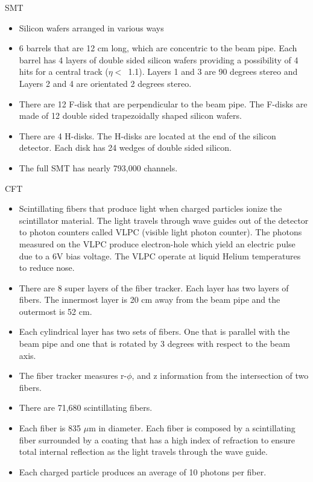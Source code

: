SMT
\begin{itemize}
\item Silicon wafers arranged in various ways
\item 6 barrels that are 12 cm long, which are concentric to the beam pipe. Each barrel has 4 layers of double sided silicon wafers providing a possibility of 4 hits for a central track ($\eta <$~1.1). Layers 1 and 3 are 90 degrees stereo and Layers 2 and 4 are orientated 2 degrees stereo.
\item There are 12 F-disk that are perpendicular to the beam pipe. The F-disks are made of 12 double sided trapezoidally shaped silicon wafers.
\item There are 4 H-disks. The H-disks are located at the end of the silicon detector. Each disk has 24 wedges of double sided silicon.
\item The full SMT has nearly 793,000 channels.
\end{itemize}

CFT
\begin{itemize}
\item Scintillating fibers that produce light when charged particles ionize the scintillator material. The light travels through wave guides out of the detector to photon counters called VLPC (visible light photon counter). The photons measured on the VLPC produce electron-hole which yield an electric pulse due to a 6V bias voltage. The VLPC operate at liquid Helium temperatures to reduce nose.
\item There are 8 super layers of the fiber tracker. Each layer has two layers of fibers. The innermost layer is 20 cm away from the beam pipe and the outermost is 52 cm.
\item Each cylindrical layer has two sets of fibers. One that is parallel with the beam pipe and one that is rotated by 3 degrees with respect to the beam axis.
\item The fiber tracker measures r-$\phi$,  and z information from the intersection of two fibers.
\item There are 71,680 scintillating fibers.
\item Each fiber is 835 $\mu$m in diameter. Each fiber is composed by a scintillating fiber surrounded by a coating that has a high index of refraction to ensure total internal reflection as the light travels through the wave guide.
\item Each charged particle produces an average of 10 photons per fiber.
\end{itemize}

